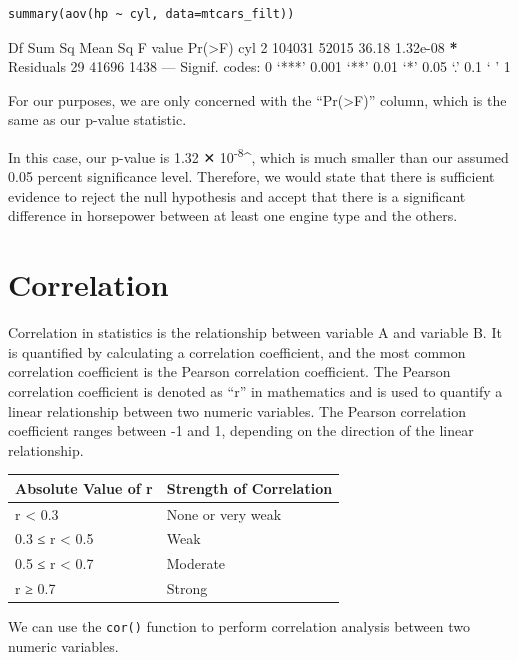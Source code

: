 \documentclass[11pt]{article}
\begin{document}
\begin{verbatim}
summary(aov(hp ~ cyl, data=mtcars_filt))
\end{verbatim}

\begin{org}
            Df Sum Sq Mean Sq F value   Pr(>F)
cyl          2 104031   52015   36.18 1.32e-08 \textbf{*}
Residuals   29  41696    1438
---
Signif. codes:  0 ‘***’ 0.001 ‘**’ 0.01 ‘*’ 0.05 ‘.’ 0.1 ‘ ’ 1
\end{org}

For our purposes, we are only concerned with the ``Pr(>F)'' column, which is the same as our p-value statistic.

In this case, our p-value is 1.32 ✕ 10\textsuperscript{-8}\^{}, which is much smaller than our assumed 0.05 percent significance level. Therefore, we would state that there is sufficient evidence to reject the null hypothesis and accept that there is a significant difference in horsepower between at least one engine type and the others.

\section{Correlation}
\label{sec:org77b8abf}

Correlation in statistics is the relationship between variable A and variable B. It is quantified by calculating a correlation coefficient, and the most common correlation coefficient is the Pearson correlation coefficient. The Pearson correlation coefficient is denoted as ``r'' in mathematics and is used to quantify a linear relationship between two numeric variables. The Pearson correlation coefficient ranges between -1 and 1, depending on the direction of the linear relationship.

\begin{center}
\begin{tabular}{ll}
Absolute Value of r & Strength of Correlation\\
\hline
r < 0.3 & None or very weak\\
0.3 ≤ r < 0.5 & Weak\\
0.5 ≤ r < 0.7 & Moderate\\
r ≥ 0.7 & Strong\\
\end{tabular}
\end{center}

We can use the \texttt{cor()} function to perform correlation analysis between two numeric variables.
\end{document}

